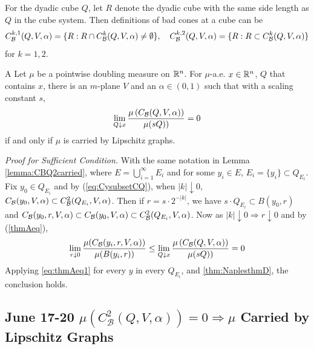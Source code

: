 \begin{definition} For the dyadic cube $Q$, let $R$ denote the dyadic cube with the same side length as $Q$ in the cube system. Then definitions of bad cones at a cube can be 
    \begin{equation*}
        C_\mathcal B^{k,1}(Q, V, \alpha) = \{R: R\cap C_\mathcal B^k(Q, V, \alpha) \neq \emptyset\}, \quad
        C_\mathcal B^{k,2}(Q, V, \alpha) = \{R: R\subset C_\mathcal B^k(Q, V, \alpha)\} 
    \end{equation*}
for $k=1,2$.
\end{definition}




\begin{customthm}{A}\label{thmA} 
    Let $\mu$ be a pointwise doubling measure on $\mathbb{R}^n$. For $\mu$-a.e. $x \in \mathbb{R}^n$, $Q$ that contains $x$, there is an $m$-plane $V$ and an $\alpha \in(0,1)$ such that with a scaling constant $s$,
    \begin{equation}\label{thmAeq}
        \lim_{Q \downarrow x} \frac{\mu\left(C_\mathcal B(Q, V, \alpha)\right)}{\mu(sQ))}=0
    \end{equation}
    if and only if $\mu$ is carried by Lipschitz graphs.
\end{customthm}
\textit{Proof for Sufficient Condition.} With the same notation in Lemma \ref{lemma:CBQ2carried}, where $E = \bigcup_{i=1}^\infty E_i$ and for some $y_i\in E$, $E_i=\{y_i\}\subset Q_{E_i}$. Fix $y_0\in Q_{E_i}$ and by (\ref{eq:CysubsetCQ}), when $|k|\downarrow 0$, $C_\mathcal B(y_0, V, \alpha)\subset C_\mathcal B^2(Q_{E_i}, V, \alpha)$. Then if $r=s\cdot 2^{-|k|}$, we have $s\cdot Q_{E_i}\subset B(y_0, r)$ and $C_\mathcal B(y_0, r, V, \alpha)\subset C_\mathcal B(y_0, V, \alpha)\subset C_\mathcal B^2(Q_{E_i}, V, \alpha)$. Now as $|k|\downarrow 0\Rightarrow r\downarrow 0$ and by (\ref{thmAeq}),
\begin{equation}\label{eq:thmAeq1}
    \lim_{r\downarrow 0} \frac{\mu(C_\mathcal B(y_i, r, V, \alpha))}{\mu(B(y_i, r))} \leq \lim_{Q \downarrow x} \frac{\mu\left(C_\mathcal B(Q, V, \alpha)\right)}{\mu(sQ))}=0
\end{equation} 
Applying \ref{eq:thmAeq1} for every $y$ in every $Q_{E_i}$, and \ref{thm:NaplesthmD}, the conclusion holds.




\newpage
\subsection{June 17-20 \texorpdfstring{$\mu(C_\mathcal{B}^2(Q, V, \alpha)) = 0 \Rightarrow \mu$ Carried by Lipschitz Graphs}{Lg}}

